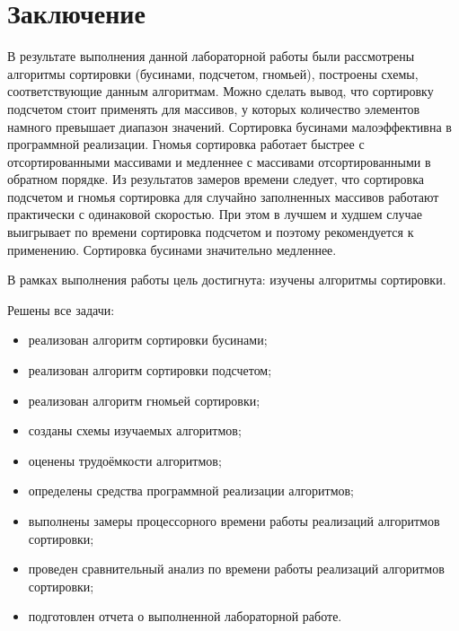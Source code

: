 \chapter*{Заключение}

В результате выполнения данной лабораторной работы были рассмотрены алгоритмы сортировки (бусинами, подсчетом, гномьей), построены схемы, соответствующие данным алгоритмам. Можно сделать вывод, что сортировку подсчетом стоит применять для массивов, у которых количество элементов намного превышает диапазон значений. Сортировка бусинами малоэффективна в программной реализации. Гномья сортировка работает быстрее с отсортированными массивами и медленнее с массивами отсортированными в обратном порядке. Из результатов замеров времени следует, что сортировка подсчетом и гномья сортировка для случайно заполненных массивов работают практически с одинаковой скоростью. При этом в лучшем и худшем случае выигрывает по времени сортировка подсчетом и поэтому рекомендуется к применению. Сортировка бусинами значительно медленнее. 

В рамках выполнения работы цель достигнута: изучены алгоритмы сортировки.

Решены все задачи:
\begin{itemize}
	\item реализован алгоритм сортировки бусинами;
	\item реализован алгоритм сортировки подсчетом;
	\item реализован алгоритм гномьей сортировки;
	\item созданы схемы изучаемых алгоритмов;
	\item оценены трудоёмкости алгоритмов;
	\item определены средства программной реализации алгоритмов;
	\item выполнены замеры процессорного времени работы реализаций алгоритмов сортировки;
	\item проведен сравнительный анализ по времени работы реализаций алгоритмов сортировки;
	\item подготовлен отчета о выполненной лабораторной работе.
\end{itemize}


